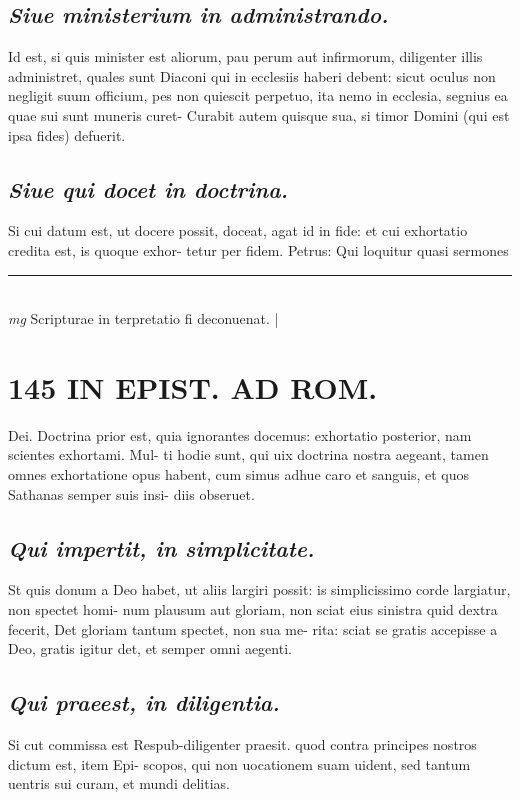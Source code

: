 \documentclass{article}
\begin{document}
\begin{pages}
\subsection*{\textit{Siue ministerium in administrando. }}\pstart Id est, si quis minister est aliorum, pau perum aut infirmorum, diligenter illis administret, quales sunt Diaconi qui in ecclesiis haberi debent: sicut oculus non negligit suum officium, pes non quiescit perpetuo, ita nemo in ecclesia, segnius ea quae sui sunt muneris curet- Curabit autem quisque sua, si timor Domini (qui est ipsa fides) defuerit.  \pend
{}
{}
\subsection*{\textit{Siue qui docet in doctrina. }}\pstart Si cui datum est, ut docere possit, doceat, agat id in fide: et cui exhortatio credita est, is quoque exhor- tetur per fidem. Petrus: Qui loquitur quasi sermones  \pend
\vspace{0.5cm}\noindent
\vspace{0.2cm}\rule{1cm}{0.2pt}\\ 
\hspace{0.2cm}\textit{mg}
\footnotesize Scripturae in terpretatio fi deconuenat. 
\normalsize| 
\section*{145 IN EPIST. AD ROM.  }
\marginpar{[ p.]}\pstart Dei. Doctrina prior est, quia ignorantes docemus: exhortatio posterior, nam scientes exhortami. Mul- ti hodie sunt, qui uix doctrina nostra aegeant, tamen omnes exhortatione opus habent, cum simus adhue caro et sanguis, et quos Sathanas semper suis insi- diis obseruet.   \pend
{}
{}
\subsection*{\textit{Qui impertit, in simplicitate. }}\pstart St quis donum a Deo habet, ut aliis largiri possit: is simplicissimo corde largiatur, non spectet homi- num plausum aut gloriam, non sciat eius sinistra quid dextra fecerit, Det gloriam tantum spectet, non sua me- rita: sciat se gratis accepisse a Deo, gratis igitur det, et semper omni aegenti.   \pend
{}
{}
\subsection*{\textit{Qui praeest, in diligentia. }}\pstart Si cut commissa est Respub-diligenter praesit. quod contra principes nostros dictum est, item Epi- scopos, qui non uocationem suam uident, sed tantum uentris sui curam, et mundi delitias.  \pend
{}
{}

\end{pages}
\end{document}
